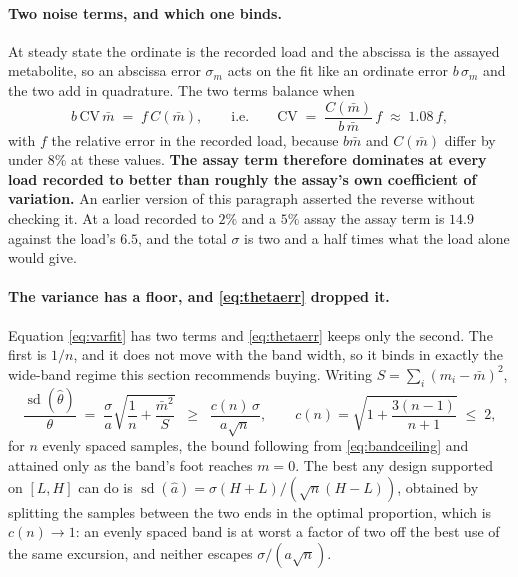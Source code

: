 \paragraph{Two noise terms, and which one binds.} At steady state the ordinate is the
recorded load and the abscissa is the assayed metabolite, so an abscissa error $\sigma_m$
acts on the fit like an ordinate error $b\,\sigma_m$ and the two add in quadrature. The two
terms balance when
\begin{equation}
b\,\mathrm{CV}\,\bar m \;=\; f\, C(\bar m),
\qquad\text{i.e.}\qquad
\mathrm{CV} \;=\; \frac{C(\bar m)}{b\,\bar m}\, f \;\approx\; 1.08\, f ,
\label{eq:crossover}
\end{equation}
with $f$ the relative error in the recorded load, because $b\bar m$ and $C(\bar m)$ differ
by under $8\%$ at these values. \textbf{The assay term therefore dominates at every load
recorded to better than roughly the assay's own coefficient of variation.} An earlier
version of this paragraph asserted the reverse without checking it. At a load recorded to
$2\%$ and a $5\%$ assay the assay term is $14.9$ against the load's $6.5$, and the total
$\sigma$ is two and a half times what the load alone would give.

\paragraph{The variance has a floor, and \eqref{eq:thetaerr} dropped it.} Equation
\eqref{eq:varfit} has two terms and \eqref{eq:thetaerr} keeps only the second. The first is
$1/n$, and it does not move with the band width, so it binds in exactly the wide-band regime
this section recommends buying. Writing $S = \sum_i (m_i - \bar m)^2$,
\begin{equation}
\frac{\operatorname{sd}(\hat\theta)}{\theta} \;=\; \frac{\sigma}{a}
\sqrt{\frac{1}{n} + \frac{\bar m^2}{S}}
\;\;\ge\;\; \frac{c(n)\,\sigma}{a\sqrt n},
\qquad
c(n) = \sqrt{1 + \frac{3(n-1)}{n+1}} \;\le\; 2 ,
\label{eq:floor}
\end{equation}
for $n$ evenly spaced samples, the bound following from \eqref{eq:bandceiling} and attained
only as the band's foot reaches $m = 0$. The best any design supported on $[L, H]$ can do is
$\operatorname{sd}(\hat a) = \sigma (H+L)/(\sqrt n (H-L))$, obtained by splitting the samples
between the two ends in the optimal proportion, which is $c(n) \to 1$: an evenly spaced band
is at worst a factor of two off the best use of the same excursion, and neither escapes
$\sigma/(a\sqrt n)$.


